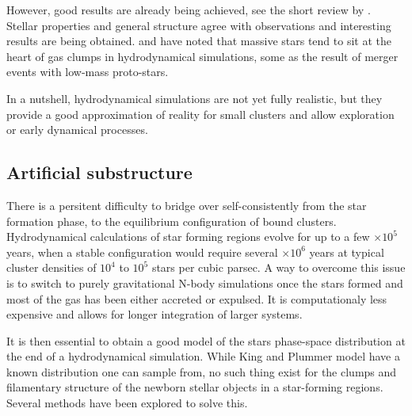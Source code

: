 However, good results are already being achieved, see the short review by \cite{Clarke2012}. Stellar properties and general structure agree with observations and interesting results are being obtained. \cite{Maschberger2011} and \cite{Moeckel2011} have noted that massive stars tend to sit at the heart of gas clumps in hydrodynamical simulations, some as the result of merger events with low-mass proto-stars. 

In a nutshell, hydrodynamical simulations are not yet fully realistic, but they provide a good approximation of reality for small clusters and allow exploration or early dynamical processes.


\subsection{Artificial substructure}

There is a persitent difficulty to bridge over self-consistently from the star formation phase, to the equilibrium configuration of bound clusters. Hydrodynamical calculations of star forming regions evolve for  up to a few $\times 10^5$ years, when a stable configuration would require several $\times 10^6$ years at typical cluster densities of $10^4$ to $10^5$ stars per cubic parsec. A way to overcome this issue is to switch to purely gravitational N-body simulations once the stars formed and most of the gas has been either accreted or expulsed. It is computationaly less expensive and allows for longer integration of larger systems.

It is then essential to obtain a good model of the stars phase-space distribution at the end of a hydrodynamical simulation. While King and Plummer model have a known distribution one can sample from, no such thing exist for the clumps and filamentary structure of the newborn stellar objects in a star-forming regions. Several methods have been explored to solve this.


